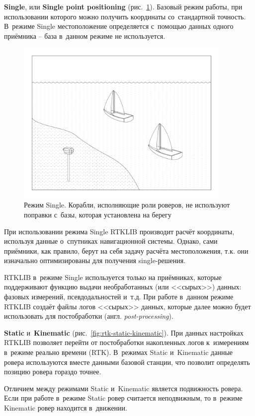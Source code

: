 \begin{dashitemize}
  \item \textbf{Single}, или \textbf{Single point positioning} (рис.~\ref{fig:rtk-single}). Базовый режим работы, при использовании которого можно получить координаты со~стандартной точность. В~режиме Single местоположение определяется с~помощью данных одного приёмника -- база в~данном режиме не используется. \par
  
  \begin{figure}[h!]
    \centering
    \setlength{\fboxsep}{5pt}
    \includegraphics[height=8cm]{img/tikz/rtk-single/pic}
    \caption{Режим Single. Корабли, исполняющие роли роверов, не используют поправки с~базы, которая установлена на берегу}\label{fig:rtk-single}
  \end{figure}

  При использовании режима Single RTKLIB производит расчёт координаты, используя данные о~спутниках навигационной системы. Однако, сами приёмники, как правило, берут на себя задачу расчёта местоположения, т.к. они изначально оптимизированы для получения single-решения. \par
  RTKLIB в~режиме Single используется только на приёмниках, которые поддерживают функцию выдачи необработанных (или <<сырых>>) данных: фазовых измерений, псевдодальностей и~т.д. При работе в~данном режиме RTKLIB создаёт файлы логов <<сырых>> данных, которые далее можно будет использовать для постобработки (англ. \emph{post-processing}).
  
  \item \textbf{Static} и~\textbf{Kinematic} (рис.~\ref{fig:rtk-static-kinematic}). При данных настройках RTKLIB позволяет перейти от постобработки накопленных логов к~измерениям в~режиме реально времени (RTK). В~режимах Static и~Kinematic данные ровера используются вместе данными базовой станции, что позволит определять позицию ровера гораздо точнее. \par
  Отличием между режимами Static и~Kinematic является подвижность ровера. Если при работе в~режиме Static ровер считается неподвижным, то в~режиме Kinematic ровер находится в~движении. \par
  

\end{dashitemize}
